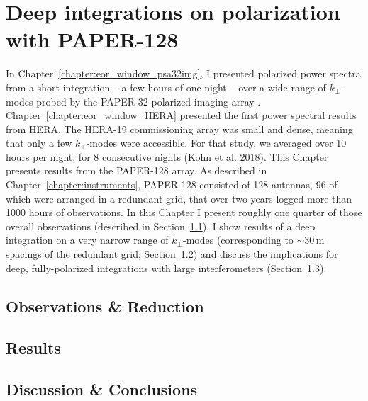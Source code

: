 \chapter{Deep integrations on polarization with PAPER-128}
\label{chapter:eor_window_psa128}

In Chapter~\ref{chapter:eor_window_psa32img}, I presented polarized power spectra from a short integration -- a few hours of one night -- over a wide range of $k_{\perp}$-modes probed by the PAPER-32 polarized imaging array \citep{Kohn.16}. Chapter~\ref{chapter:eor_window_HERA} presented the first power spectral results from HERA. The HERA-19 commissioning array was small and dense, meaning that only a few $k_{\perp}$-modes were accessible. For that study, we averaged over 10 hours per night, for 8 consecutive nights {\color{red} (Kohn et al. 2018)}. This Chapter presents results from the PAPER-128 array. As described in Chapter~\ref{chapter:instruments},  PAPER-128 consisted of 128 antennas, 96 of which were arranged in a redundant grid, that over two years logged more than 1000 hours of observations. In this Chapter I present roughly one quarter of those overall observations (described in Section~\ref{sec:psa128_obs}). I show results of a deep integration on a very narrow range of $k_{\perp}$-modes (corresponding to $\sim$30\,m spacings of the redundant grid; Section~\ref{sec:psa128_results}) and discuss the implications for deep, fully-polarized integrations with large interferometers (Section~\ref{sec:psa128_conc}).

\section{Observations \& Reduction}
\label{sec:psa128_obs}


%
%

\section{Results}
\label{sec:psa128_results}


\section{Discussion \& Conclusions}
\label{sec:psa128_conc}
